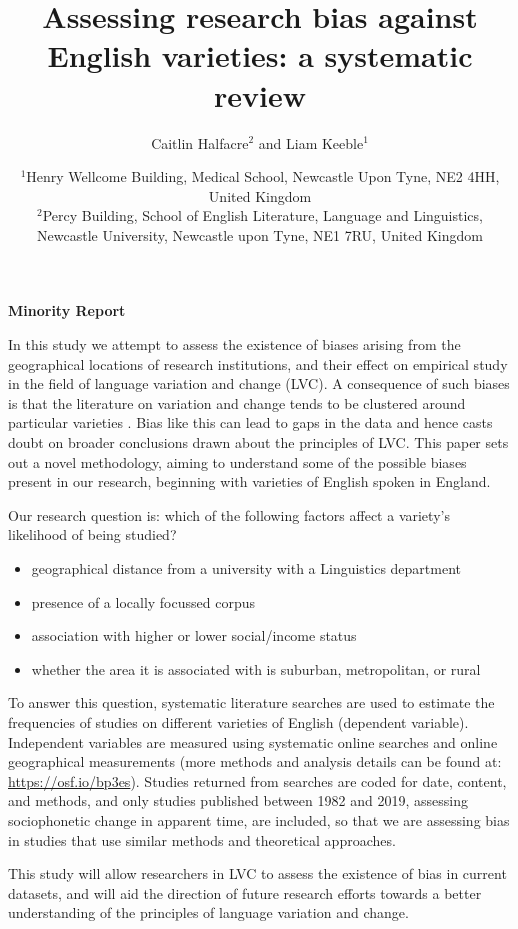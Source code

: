 \documentclass[12pt,a4paper]{article}
\title{Assessing research bias against English varieties: a systematic review}
\author{Caitlin Halfacre$^{2}$ and Liam Keeble$^{1}$}
\date{$^{1}$Henry Wellcome Building, Medical School, Newcastle Upon Tyne, NE2 4HH, United Kingdom\\
$^{2}$Percy Building, School of English Literature, Language and Linguistics, Newcastle University, Newcastle upon Tyne, NE1 7RU, United Kingdom\\}
\newcommand{\todocontentinline}[1]{\todo[color=RoyalPurple,inline]{#1}}
\begin{document}
\begin{center}
	\textbf{Minority Report}\\
\end{center}

\todocontentinline{Current word count 293}

In this study we attempt to assess the existence of biases arising from the geographical locations of research institutions, and their effect on empirical study in the field of language variation and change (LVC).  
A consequence of such biases is that the literature on variation and change tends to be clustered around particular varieties \citep{Trudgill2002}. Bias like this can lead to gaps in the data and hence casts doubt on broader conclusions drawn about the principles of LVC. This paper sets out a novel methodology, aiming to understand some of the possible biases present in our research, beginning with varieties of English spoken in England. 
	
Our research question is: which of the following factors affect a variety's likelihood of being studied?
	\begin{itemize}
		\item geographical distance from a university with a Linguistics department
		\item presence of a locally focussed corpus
		\item association with higher or lower social/income status
		\item whether the area it is associated with is suburban, metropolitan, or rural
	\end{itemize}


To answer this question, systematic literature searches \citep{lefebvre2019searching} are used to estimate the frequencies of studies on different varieties of English (dependent variable). Independent variables are measured using systematic online searches and online geographical measurements (more methods and analysis details can be found at: \url{ https://osf.io/bp3es}). Studies returned from searches are coded for date, content, and methods, and only studies published between 1982 \citep{Wells1982b} and 2019, assessing sociophonetic change in apparent time, are included, so that we are assessing bias in studies that use similar methods and theoretical approaches.

This study will allow researchers in LVC to assess the existence of bias in current datasets, and will aid the direction of future research efforts towards a better understanding of the principles of language variation and change. 

\pagebreak

\end{document}

